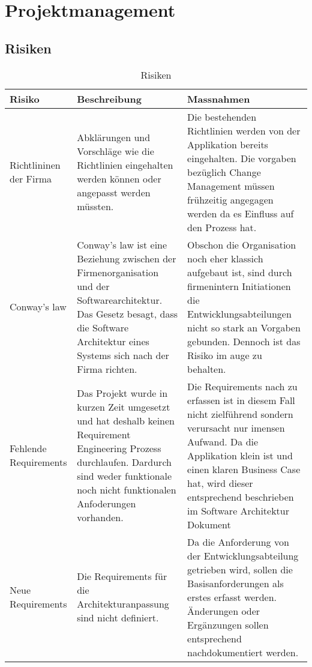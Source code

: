 \chapter{Projektmanagement}

\begin{landscape}
\thispagestyle{empty}

\section{Risiken}
	\begin{table}[h!]
		\centering
		\caption{Risiken}
		\label{tab:table1}
		\begin{tabular}{ | p{2cm} | p{10cm} | p{10cm} | }
			\toprule
			{\textbf{Risiko}} & {\textbf{Beschreibung}} & {\textbf{Massnahmen}} \\
			\midrule
			Richtlininen der Firma & Abklärungen und Vorschläge wie die Richtlinien eingehalten werden können oder angepasst werden müssten. & Die bestehenden Richtlinien werden von der Applikation bereits eingehalten. Die vorgaben bezüglich Change Management müssen frühzeitig angegagen werden da es Einfluss auf den Prozess hat. \\ \hline
			Conway's law & Conway's law ist eine Beziehung zwischen der Firmenorganisation und der Softwarearchitektur. Das Gesetz besagt, dass die Software Architektur eines Systems sich nach der Firma richten. & Obschon die Organisation noch eher klassich aufgebaut ist, sind durch firmenintern Initiationen die Entwicklungsabteilungen nicht so stark an Vorgaben gebunden. Dennoch ist das Risiko im auge zu behalten. \\ \hline
			Fehlende Requirements & Das Projekt wurde in kurzen Zeit umgesetzt und hat deshalb keinen Requirement Engineering Prozess durchlaufen. Dardurch sind weder funktionale noch nicht funktionalen Anfoderungen vorhanden. & Die Requirements nach zu erfassen ist in diesem Fall nicht zielführend sondern verursacht nur imensen Aufwand. Da die Applikation klein ist und einen klaren Business Case hat,  wird dieser entsprechend beschrieben im Software Architektur Dokument\\ \hline
			Neue Requirements & Die Requirements für die Architekturanpassung sind nicht definiert. & Da die Anforderung von der Entwicklungsabteilung getrieben wird, sollen die Basisanforderungen als erstes erfasst werden. Änderungen oder Ergänzungen sollen entsprechend nachdokumentiert werden.\\
			\bottomrule
		\end{tabular}
	\end{table}
\vfill
\raisebox{0pt}{\makebox[\linewidth][r]{\thepage}}
\end{landscape}
\restoregeometry


